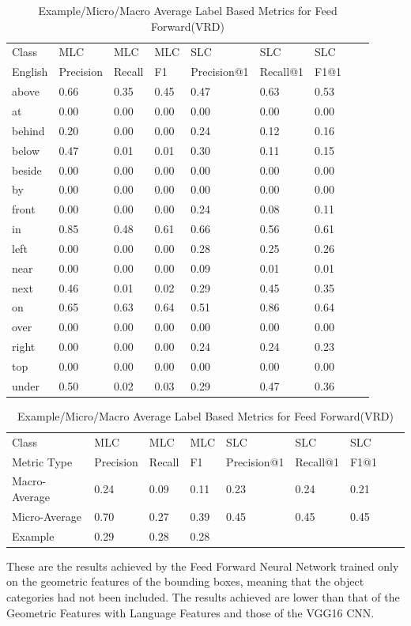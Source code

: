 \documentclass{csfyp}
\begin{document}
\begin{table}[!htbp]
\centering
\begin{tabular}{|l|l|l|l|l|l|l|l|l}
\cline{1-7}
Class   &  MLC  &  MLC  &  MLC & SLC &  SLC & SLC \\ \cline{1-7}
English & Precision &  Recall   & F1 & Precision@1 & Recall@1 & F1@1 \\ \cline{1-7} 
above	&	0.66	&	0.35	&	0.45	&	0.47	&	0.63	&	0.53 \\ \cline{1-7} 
at	    &	0.00	&	0.00	&	0.00	&	0.00	&	0.00	&	0.00 \\ \cline{1-7}
behind	&	0.20	&	0.00	&	0.00	&	0.24	&	0.12	&	0.16 \\ \cline{1-7}
below	&	0.47	&	0.01	&	0.01	&	0.30	&	0.11	&	0.15 \\ \cline{1-7} 
beside	&	0.00	&	0.00	&	0.00	&	0.00	&	0.00	&	0.00 \\ \cline{1-7} 
by	    &	0.00	&	0.00	&	0.00	&	0.00	&	0.00	&	0.00 \\ \cline{1-7}
front	&	0.00	&	0.00	&	0.00	&	0.24	&	0.08	&	0.11 \\ \cline{1-7}
in	    &	0.85	&	0.48	&	0.61	&	0.66	&	0.56	&	0.61 \\ \cline{1-7}
left	&	0.00	&	0.00	&	0.00	&	0.28	&	0.25	&	0.26 \\ \cline{1-7}
near	&	0.00	&	0.00	&	0.00	&	0.09	&	0.01	&	0.01 \\ \cline{1-7}
next	&	0.46	&	0.01	&	0.02	&	0.29	&	0.45	&	0.35 \\ \cline{1-7}
on	    &	0.65	&	0.63	&	0.64	&	0.51	&	0.86	&	0.64 \\ \cline{1-7}
over	&	0.00	&	0.00	&	0.00	&	0.00	&	0.00	&	0.00 \\ \cline{1-7}
right	&	0.00	&	0.00	&	0.00	&	0.24	&	0.24	&	0.23 \\ \cline{1-7}
top	    &	0.00	&	0.00	&	0.00	&	0.00	&	0.00	&	0.00 \\ \cline{1-7}
under	&	0.50	&	0.02	&	0.03	&	0.29	&	0.47	&	0.36 \\ \cline{1-7}
\end{tabular}
\caption{Feed Forward(VRD) results for MLC and SLC}
\centering
\begin{tabular}{|l|l|l|l|l|l|l|l|l}
\cline{1-7}
Class &  MLC  &  MLC  &  MLC & SLC &  SLC & SLC \\ \cline{1-7}
Metric Type  & Precision &  Recall & F1 & Precision@1 & Recall@1 & F1@1 \\ \cline{1-7}
Macro-Average &	0.24	&	0.09	&	0.11	&	0.23	&	0.24	&	0.21 \\ \cline{1-7}
Micro-Average &	0.70	&	0.27	&	0.39	&	0.45	&	0.45	&	0.45 \\ \cline{1-7}
Example       &	0.29	&	0.28	&	0.28    \\ \cline{1-4}
\end{tabular}
\caption{Example/Micro/Macro Average Label Based Metrics for Feed Forward(VRD)}
These are the results achieved by the Feed Forward Neural Network trained only on the geometric features of the bounding boxes, meaning that the object categories had not been included. The results achieved are lower than that of the Geometric Features with Language Features and those of the VGG16 CNN.
\vspace{-4mm}
\end{table}
\newpage
\end{document}
